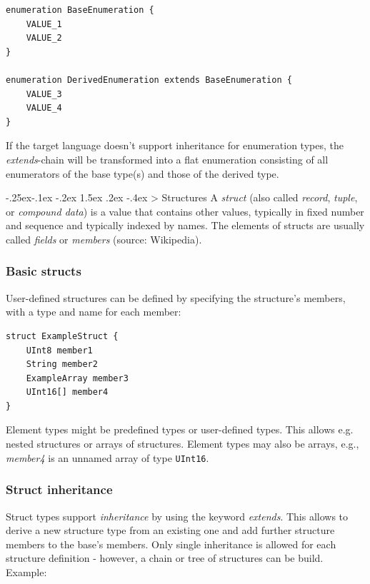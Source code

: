 \documentclass[a4paper,10pt]{scrreprt}
\makeatletter
\renewcommand\subsection{\medskip\@startsection{subsection}{2}{\z@}%
  {-.25ex\@plus -.1ex \@minus -.2ex}%
  {1.5ex \@plus .2ex \@minus -.4ex}%
  {\ifnum \scr@compatibility>\@nameuse{scr@v@2.96}\relax
    \setlength{\parfillskip}{\z@ plus 1fil}\fi
    \raggedsection\normalfont\sectfont\nobreak\size@subsection
  }%
}
\makeatother
\begin{document}
\begin{lstlisting}[language=Franca]
enumeration BaseEnumeration {
	VALUE_1
	VALUE_2
}

enumeration DerivedEnumeration extends BaseEnumeration {
	VALUE_3
	VALUE_4
}
\end{lstlisting}

If the target language doesn't support inheritance for enumeration types, the \textit{extends}-chain
will be transformed into a flat enumeration consisting of all enumerators of the base type(s)
and those of the derived type.

\subsection{Structures}
\label{FIDL_Types_Struct}
A \textit{struct} (also called \textit{record}, \textit{tuple}, or \textit{compound data}) is a value that contains
other values, typically in fixed number and sequence and typically indexed by names.
The elements of structs are usually called \textit{fields} or \textit{members} (source: Wikipedia).

\subsubsection{Basic structs}
\label{FIDL_Types_Struct_Basic}
User-defined structures can be defined by specifying the structure's members, with a type
and name for each member: 

\begin{lstlisting}[language=Franca]
struct ExampleStruct {
	UInt8 member1
	String member2
	ExampleArray member3
	UInt16[] member4
}
\end{lstlisting}

Element types might be predefined types or user-defined types. This allows e.g. nested structures or
arrays of structures. Element types may also be arrays, e.g., \textit{member4} is an unnamed array of type
\protect\lstinline[language=Franca]{UInt16}. 

\subsubsection{Struct inheritance}
\label{FIDL_Types_Struct_Inheritance}
Struct types support \textit{inheritance} by using the keyword \textit{extends}.
This allows to derive a new structure type from an existing one and add
further structure members to the base's members. Only single inheritance is allowed for
each structure definition - however, a chain or tree of structures can be build. Example:
\end{document}
